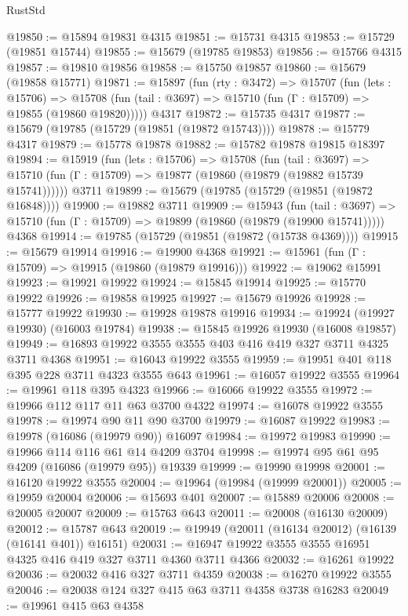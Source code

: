 \begin{lexlean}{RustStd}
\begin{coremodule}
@19850 := @15894 @19831 @4315
@19851 := @15731 @4315
@19853 := @15729 (@19851 @15744)
@19855 := @15679 (@19785 @19853)
@19856 := @15766 @4315
@19857 := @19810 @19856
@19858 := @15750 @19857
@19860 := @15679 (@19858 @15771)
@19871 := @15897
    (fun (rty : @3472) =>
    @15707
      (fun (lets : @15706) =>
      @15708 (fun (tail : @3697) => @15710 (fun (Γ : @15709) => @19855 (@19860 @19820)))))
    @4317
@19872 := @15735 @4317
@19877 := @15679 (@19785 (@15729 (@19851 (@19872 @15743))))
@19878 := @15779 @4317
@19879 := @15778 @19878
@19882 := @15782 @19878 @19815 @18397
@19894 := @15919
    (fun (lets : @15706) =>
    @15708
      (fun (tail : @3697) =>
      @15710 (fun (Γ : @15709) => @19877 (@19860 (@19879 (@19882 @15739 @15741))))))
    @3711
@19899 := @15679 (@19785 (@15729 (@19851 (@19872 @16848))))
@19900 := @19882 @3711
@19909 := @15943
    (fun (tail : @3697) => @15710 (fun (Γ : @15709) => @19899 (@19860 (@19879 (@19900 @15741)))))
    @4368
@19914 := @19785 (@15729 (@19851 (@19872 (@15738 @4369))))
@19915 := @15679 @19914
@19916 := @19900 @4368
@19921 := @15961 (fun (Γ : @15709) => @19915 (@19860 (@19879 @19916)))
@19922 := @19062 @15991
@19923 := @19921 @19922
@19924 := @15845 @19914
@19925 := @15770 @19922
@19926 := @19858 @19925
@19927 := @15679 @19926
@19928 := @15777 @19922
@19930 := @19928 @19878 @19916
@19934 := @19924 (@19927 @19930) (@16003 @19784)
@19938 := @15845 @19926 @19930 (@16008 @19857)
@19949 := @16893 @19922 @3555 @3555 @403 @416 @419 @327 @3711 @4325 @3711 @4368
@19951 := @16043 @19922 @3555
@19959 := @19951 @401 @118 @395 @228 @3711 @4323 @3555 @643
@19961 := @16057 @19922 @3555
@19964 := @19961 @118 @395 @4323
@19966 := @16066 @19922 @3555
@19972 := @19966 @112 @117 @11 @63 @3700 @4322
@19974 := @16078 @19922 @3555
@19978 := @19974 @90 @11 @90 @3700
@19979 := @16087 @19922
@19983 := @19978 (@16086 (@19979 @90)) @16097
@19984 := @19972 @19983
@19990 := @19966 @114 @116 @61 @14 @4209 @3704
@19998 := @19974 @95 @61 @95 @4209 (@16086 (@19979 @95)) @19339
@19999 := @19990 @19998
@20001 := @16120 @19922 @3555
@20004 := @19964 (@19984 (@19999 @20001))
@20005 := @19959 @20004
@20006 := @15693 @401
@20007 := @15889 @20006
@20008 := @20005 @20007
@20009 := @15763 @643
@20011 := @20008 (@16130 @20009)
@20012 := @15787 @643
@20019 := @19949 (@20011 (@16134 @20012) (@16139 (@16141 @401)) @16151)
@20031 := @16947 @19922 @3555 @3555 @16951 @4325 @416 @419 @327 @3711 @4360 @3711 @4366
@20032 := @16261 @19922
@20036 := @20032 @416 @327 @3711 @4359
@20038 := @16270 @19922 @3555
@20046 := @20038 @124 @327 @415 @63 @3711 @4358 @3738 @16283
@20049 := @19961 @415 @63 @4358

\end{coremodule}
\end{lexlean}
